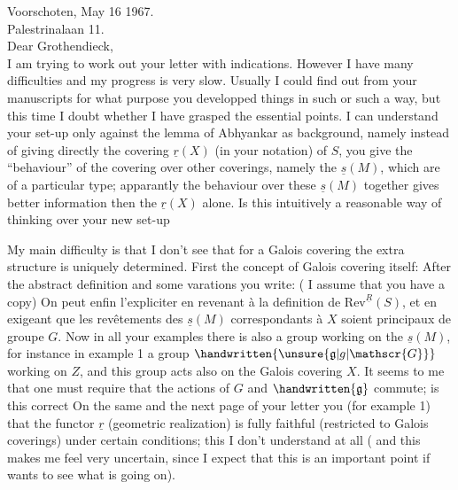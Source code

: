 Voorschoten, May 16 1967.\\
Palestrinalaan 11.\\

Dear Grothendieck,\\

I am trying to work out your letter with indications. However I have many difficulties and my progress is very slow. Usually I could find out from your manuscripts for what purpose you developped things in such or such a way, but this time I doubt whether I have grasped the essential points. I can understand your set-up only against the lemma of Abhyankar as background, namely instead of giving directly the covering $\underline{r}(X)$ (in your notation) of $S$, you give the ``behaviour'' of the covering over other coverings, namely the $\underline{s}(M)$, which are of a particular type; apparantly the behaviour over  these $\underline{s}(M)$ together gives better information then the $\underline{r}(X)$ alone. Is this intuitively a reasonable way of thinking over your new set-up

My main difficulty is that I don't see that for a Galois covering the extra structure is uniquely determined. First the concept of Galois covering itself: After the abstract definition and some varations you write: ( I assume that you have a copy) On peut enfin l'expliciter en revenant à la definition de $\mathrm{Rev}^{\underline{R}}(S)$, et en exigeant que les revêtements des $\underline{s}(M)$ correspondants à $X$ soient principaux de groupe $G$. Now in all your examples there is also a group working on the $\underline{s}(M)$, for instance in example 1 a group $\handwritten{\unsure{\mathfrak{g}|g|\mathscr{G}}}$ working on $Z$, and this group acts also on the Galois covering  $X$. It seems to me that one must require that the actions of $G$ and $\handwritten{\mathfrak{g}}$ commute; is this correct On the same and the next page of your letter you  (for example 1) that the functor $\underline{r}$ (geometric realization) is fully faithful (restricted to Galois coverings) under certain conditions; this I don't understand at all ( and  this makes me feel very uncertain, since I expect that this is an important point  if  wants to see what is going on\handwritten{!}).

